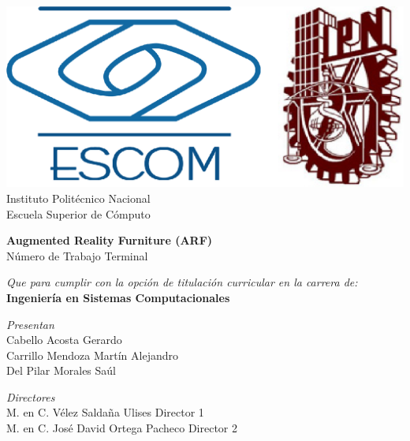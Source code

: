 
\begin{titlepage}

    \centering %

    \includegraphics[scale=0.17]{imagenes/escom-ipn} %
    \LARGE{\\ Instituto Polit\'ecnico Nacional}
    \LARGE{\\ Escuela Superior de C\'omputo}
    
    \vspace{1cm} %

    \LARGE \textbf{Augmented Reality Furniture (ARF)}
    \LARGE {\\ Número de Trabajo Terminal}

    \vspace{1cm} %

    \LARGE \textit{Que para cumplir con la opción de titulación curricular en la carrera de:}
    \LARGE \textbf{\\ Ingeniería en Sistemas Computacionales}

    \vspace{1cm} %

   \textit{Presentan}\\
    Cabello Acosta Gerardo\\
    Carrillo Mendoza Martín Alejandro \\
    Del Pilar Morales Saúl

    \vspace{1cm} %

   \textit{Directores}\\
    M. en C. Vélez Saldaña Ulises \bigskip Director 1 \\
    M. en C. José David Ortega Pacheco \bigskip  Director 2
\end{titlepage}